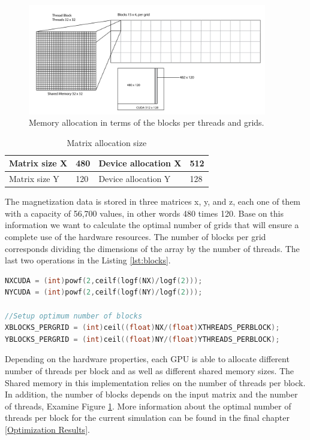 \begin{figure}[htbp]
	\centering
		\includegraphics[width=0.93\textwidth]{Figures/block.png}
		\smallskip
	\caption[Grid layout]{Memory allocation in terms of the blocks per threads and grids.}
	\label{fig:block}
\end{figure}


\begin{table}[h]
\centering
\begin{tabular}{| l | l | l | l | }
\hline
Matrix size X & 480 & Device allocation X & 512\\
\hline
Matrix size Y & 120 & Device allocation Y & 128 \\
\hline
\end{tabular}
\caption{Matrix allocation size}
\label{tab:cuda}
\end{table}

The magnetization data is stored in three matrices x, y, and z, each one of them with a capacity of 56,700 values, in other words 480 times 120. Base on this information we want to calculate the optimal number of grids that will ensure a complete use of the hardware resources. The number of blocks per grid corresponds dividing the dimensions of the array by the number of threads. The last two operations in the Listing \ref{lst:blocks}.

\begin{lstlisting}[language=C++, label={lst:blocks}, caption={Device capacity calculation and number of block per grid}]	
NXCUDA = (int)powf(2,ceilf(logf(NX)/logf(2)));
NYCUDA = (int)powf(2,ceilf(logf(NY)/logf(2)));

//Setup optimum number of blocks
XBLOCKS_PERGRID = (int)ceil((float)NX/(float)XTHREADS_PERBLOCK); 
YBLOCKS_PERGRID = (int)ceil((float)NY/(float)YTHREADS_PERBLOCK);
\end{lstlisting}

Depending on the hardware properties, each GPU is able to allocate different number of threads per block and as well as different shared memory sizes. The Shared memory in this implementation relies on the number of threads per block. In addition, the number of blocks depends on the input matrix and the number of threads, Examine Figure \ref{fig:block}. More information about the optimal number of threads per block for the current simulation can be found in the final chapter \ref{Optimization Results}. 

